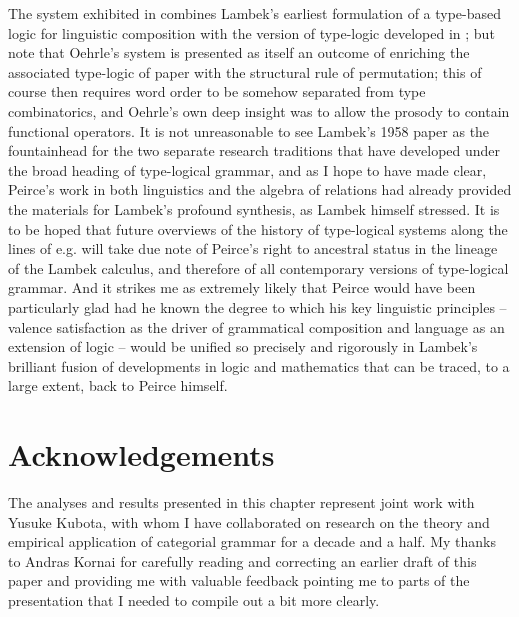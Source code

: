 \documentclass[output=paper,colorlinks,citecolor=brown]{langscibook}
\begin{document}
The system exhibited in  combines Lambek's earliest formulation
of a type-based logic for linguistic composition with the version of
type-logic developed in \citet{oehrle1994}; but note that Oehrle's system is
presented as itself an outcome of enriching the associated type-logic
of  paper with the structural rule of permutation; this
of course then requires word order to be somehow separated from type
combinatorics, and Oehrle's own deep insight was to allow the prosody
to contain functional operators. It is not unreasonable to see
Lambek's 1958 paper as the fountainhead for the two separate research
traditions that have developed under the broad heading of type-logical
grammar, and as I hope to have made clear, Peirce's work in both
linguistics and the algebra of relations had already provided the
materials for Lambek's profound synthesis, as Lambek himself stressed.
It is to be hoped that future overviews of the history of type-logical
systems along the lines of e.g. \citet{moortgat2010} will take due note of Peirce's right to
ancestral status in the lineage of the Lambek calculus, and therefore
of all contemporary versions of type-logical grammar. And it strikes
me as extremely likely that Peirce would have been
particularly glad had he known the degree to which his key
linguistic principles -- valence satisfaction as the driver of
grammatical composition and language as an extension of logic -- would
be unified so precisely and rigorously in Lambek's brilliant fusion
of developments in logic and mathematics that can be traced, to a large
extent, back to Peirce himself.




\section*{Acknowledgements}
The analyses and results
presented in this chapter represent joint work with Yusuke Kubota, with whom I
have collaborated on research on the theory and empirical application of
categorial grammar for a decade and a half. My thanks to Andras Kornai
for carefully reading and correcting an earlier draft of this paper
and providing me with valuable feedback pointing me to parts of
the presentation that I needed to compile out a bit more clearly.

{\sloppy\printbibliography[heading=subbibliography,notkeyword=this]}
\end{document}
